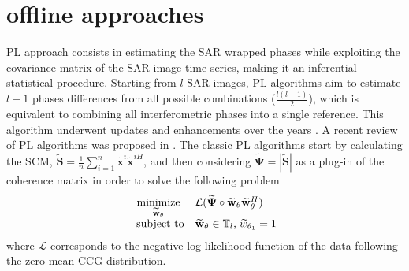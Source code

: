 \section{offline approaches}
    \label{section:PL}
    \acs{PL} approach consists in estimating the \acs{SAR} wrapped phases while exploiting the covariance matrix of the \acs{SAR} image time series, making it an inferential statistical procedure. Starting from $l$ \acs{SAR} images, \acs{PL} algorithms aim to estimate $l-1$ phases differences from all possible combinations ($\frac{l(l-1)}{2}$), which is equivalent to combining all interferometric phases into a single reference. This algorithm underwent updates and enhancements over the years \citep{guarnieri2008exploitation, 9763551, vu2023robust, gao2024distributed, ferretti2011new, ansari2018efficient}. A recent review of \acs{PL} algorithms was proposed in \citep{10261889, cao2015mathematical}. %
    The classic \ac{PL} \citep{guarnieri2008exploitation} algorithms start by calculating the \ac{SCM}, $\mathbf{\widetilde{S}} = \frac{1}{n} \sum_{i=1}^n \mathbf{\widetilde{x}}^i \mathbf{\widetilde{x}}^{iH}$, and then considering $\mathbf{\widetilde{\Psi}} = |\mathbf{\widetilde{S}}|$ %
    as a plug-in of the coherence matrix in order to solve the following problem 
    \vspace{-1em}
    \begin{gather}
    \label{eq:classic_phaselinking}
        \begin{array}{cl}
        \underset{\mathbf{\widetilde{w}}_{\mathbf{\theta}}}{\rm minimize}
        & 
        \mathcal{L}(\mathbf{\widetilde{\Psi}} \circ \mathbf{\widetilde{w}}_{\mathbf{\theta}}\mathbf{\widetilde{w}}_{\mathbf{\theta}}^H) \\
        \text{ subject to}
        & \mathbf{\widetilde{w}}_{\theta} \in \mathbb{T}_{l} \text{,} \; \widetilde{w}_{\theta_1} = 1 %
        \end{array}
    \end{gather}
    \noindent
    where $\mathcal{L}$ corresponds to the negative log-likelihood function of the data following the zero mean \ac{CCG} distribution. %
    

